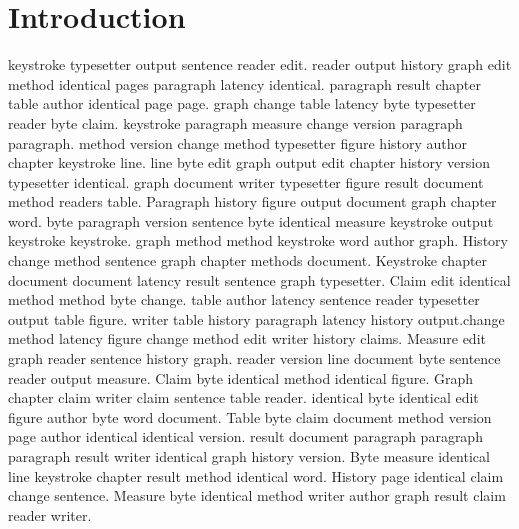 \documentclass{article}
\begin{document}
\section{Introduction}
keystroke typesetter output sentence reader edit. reader output history graph edit method identical pages paragraph latency identical. paragraph result chapter table author identical page page. graph change table latency byte typesetter reader byte claim. keystroke paragraph measure change version paragraph paragraph. method version change method typesetter figure history author chapter keystroke line. line byte edit graph output edit chapter history version typesetter identical. graph document writer typesetter figure result document method readers table. Paragraph history figure output document graph chapter word. byte paragraph version sentence byte identical measure keystroke output keystroke keystroke. graph method method keystroke word author graph. History change method sentence graph chapter methods document. Keystroke chapter document document latency result sentence graph typesetter. Claim edit identical method method byte change. table author latency sentence reader typesetter output table figure. writer table history paragraph latency history output.change method latency figure change method edit writer history claims.  Measure edit graph reader sentence history graph. reader version line document byte sentence reader output measure. Claim byte identical method identical figure. Graph chapter claim writer claim sentence table reader. identical byte identical edit figure author byte word document. Table byte claim document method version page author identical identical version. result document paragraph paragraph paragraph result writer identical graph history version. Byte measure identical line keystroke chapter result method identical word. History page identical claim change sentence. Measure byte identical method writer author graph result claim reader writer.
\end{document}

